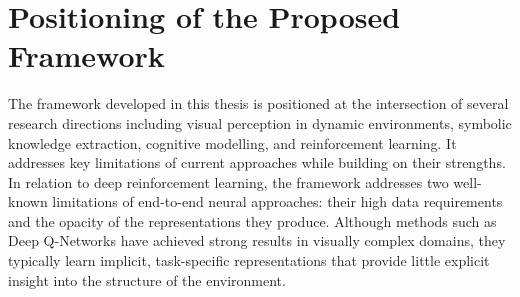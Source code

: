 \documentclass[12pt,a4paper]{report}
\begin{document}
\section{Positioning of the Proposed Framework}
The framework developed in this thesis is positioned at the intersection of several research directions including visual perception in dynamic environments, symbolic knowledge extraction, cognitive modelling, and reinforcement learning. It addresses key limitations of current approaches while building on their strengths.
In relation to deep reinforcement learning, the framework addresses two well-known limitations of end-to-end neural approaches: their high data requirements and the opacity of the representations they produce. Although methods such as Deep Q-Networks have achieved strong results in visually complex domains, they typically learn implicit, task-specific representations that provide little explicit insight into the structure of the environment.
\end{document}
